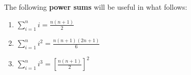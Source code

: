 
\begin{frame}
The following \textbf{power sums} will be useful in what follows:
\begin{enumerate}
\item $\displaystyle  \sum_{i=1}^n i  =  \frac{n(n+1)}{2} $\pause
\item $\displaystyle  \sum_{i=1}^n i^2  =  \frac{n(n+1)(2n+1)}{6} $\pause
\item $ \displaystyle \sum_{i=1}^n i^3  =  \left[\frac{n(n+1)}{2}\right]^2 $
\end{enumerate}
\end{frame}

